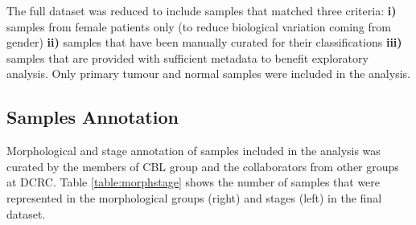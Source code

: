     The full dataset was reduced to include samples that matched three criteria: \textbf{i)} samples from female patients only (to reduce biological variation coming from gender) \textbf{ii)} samples that have been manually curated for their classifications \textbf{iii)} samples that are provided with sufficient metadata to benefit exploratory analysis. Only primary tumour and normal samples were included in the analysis.
    
    
    \subsection{Samples Annotation}
    Morphological and stage annotation of samples included in the analysis was curated by the members of CBL group and the collaborators from other groups at DCRC. Table \ref{table:morphstage} shows the number of samples that were represented in the morphological groups (right) and stages (left) in the final dataset. 
    
